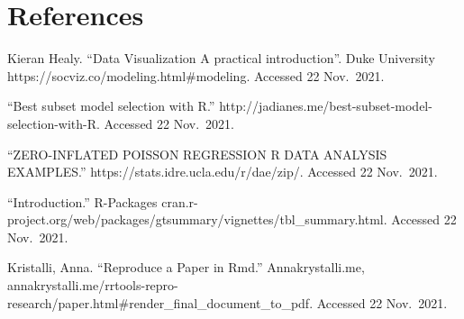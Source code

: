 \documentclass[]{elsarticle} %
\begin{document}
\newpage

\hypertarget{references}{%
\section{References}\label{references}}

Kieran Healy. ``Data Visualization \textbar{} A practical
introduction''. Duke University
https://socviz.co/modeling.html\#modeling. Accessed 22 Nov.~2021.

``Best subset model selection with R.''
http://jadianes.me/best-subset-model-selection-with-R. Accessed 22
Nov.~2021.

``ZERO-INFLATED POISSON REGRESSION \textbar{} R DATA ANALYSIS
EXAMPLES.'' https://stats.idre.ucla.edu/r/dae/zip/. Accessed 22
Nov.~2021.

``Introduction.'' R-Packages
cran.r-project.org/web/packages/gtsummary/vignettes/tbl\_summary.html.
Accessed 22 Nov.~2021.

Kristalli, Anna. ``Reproduce a Paper in Rmd.'' Annakrystalli.me,
annakrystalli.me/rrtools-repro-research/paper.html\#render\_final\_document\_to\_pdf.
Accessed 22 Nov.~2021.
\end{document}
